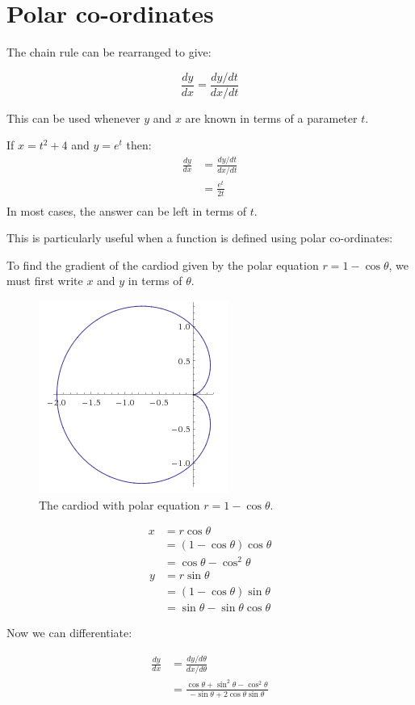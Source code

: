 \section{Polar co-ordinates}
The chain rule can be rearranged to give:

\begin{in_a_box}
\[\frac{dy}{dx}=\frac{dy/dt}{dx/dt}\]
\end{in_a_box}

This can be used whenever $y$ and $x$ are known in terms of a parameter $t$.

\begin{example}
If $x=t^2 + 4$ and $y=e^t$ then:
\begin{align*}
\frac{dy}{dx}&=\frac{dy/dt}{dx/dt}\\
&=\frac{e^t}{2t}\\
\end{align*}
In most cases, the answer can be left in terms of $t$.
\end{example}

This is particularly useful when a function is defined using polar co-ordinates:
\begin{example}
To find the gradient of the cardiod given by the polar equation $r=1-\cos\theta$,
we must first write $x$ and $y$ in terms of $\theta$.

\begin{figure}[H]
  \centering
  \includegraphics[scale=0.6]{img/1-costheta.png}
  \caption{The cardiod with polar equation $r=1-\cos\theta$.}
\end{figure}

\begin{align*}
x&=r\cos\theta\\
&=(1-\cos\theta)\cos\theta\\
&=\cos\theta-\cos^2\theta
\end{align*}
\begin{align*}
y&=r\sin\theta\\
&=(1-\cos\theta)\sin\theta\\
&=\sin\theta-\sin\theta\cos\theta
\end{align*}

Now we can differentiate:

\begin{align*}
\frac{dy}{dx}&=\frac{dy/d\theta}{dx/d\theta}\\
&=\frac{\cos\theta + \sin^2\theta-\cos^2\theta}{-\sin\theta+2\cos\theta\sin\theta}\\
\end{align*}
\end{example}


